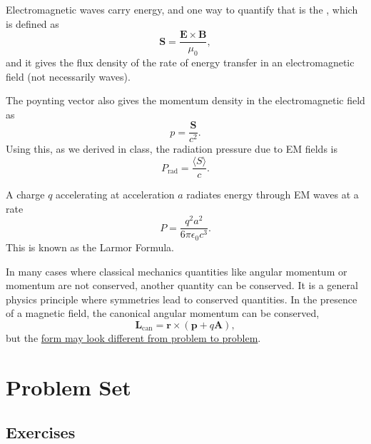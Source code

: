 \documentclass[11pt]{scrartcl}
\begin{document}
\begin{defn}
    Electromagnetic waves carry energy, and one way to quantify that is the , which is defined as
    $$\mathbf S = \frac{\mathbf E \times \mathbf B}{\mu_0},$$
    and it gives the flux density of the rate of energy transfer in an electromagnetic field (not necessarily waves).
\end{defn}

\begin{theorem}
    The poynting vector also gives the momentum density in the electromagnetic field as
    $$p = \frac{\mathbf S}{c^2}.$$
    Using this, as we derived in class, the radiation pressure due to EM fields is
    $$P_{\text{rad}} = \frac{\langle S\rangle}{c}.$$
\end{theorem}

\begin{theorem}
    A charge $q$ accelerating at acceleration $a$ radiates energy through EM waves at a rate
    $$P = \frac{q^2a^2}{6\pi \epsilon_0 c^3}.$$
    This is known as the Larmor Formula.
\end{theorem}

\begin{idea}
    In many cases where classical mechanics quantities like angular momentum or momentum are not conserved, another quantity can be conserved. It is a general physics principle where symmetries lead to conserved quantities. In the presence of a magnetic field, the canonical angular momentum can be conserved,
    $$\mathbf L_{\text{can}} = \mathbf r \times (\mathbf p + q\mathbf A),$$
    but the \underline{form may look different from problem to problem}.
\end{idea}



\section{Problem Set}

\subsection{Exercises}
\end{document}
